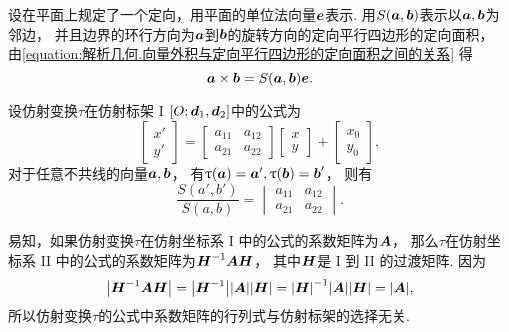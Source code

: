 设在平面上规定了一个定向，用平面的单位法向量\(\boldsymbol{e}\)表示.
用\(S(\boldsymbol{a},\boldsymbol{b})\)表示以\(\boldsymbol{a},\boldsymbol{b}\)为邻边，
并且边界的环行方向为\(\boldsymbol{a}\)到\(\boldsymbol{b}\)的旋转方向的定向平行四边形的定向面积，
由\cref{equation:解析几何.向量外积与定向平行四边形的定向面积之间的关系} 得\begin{equation*}
	\boldsymbol{a}\times\boldsymbol{b}
	= S(\boldsymbol{a},\boldsymbol{b})
	\boldsymbol{e}.
\end{equation*}

\begin{theorem}\label{theorem:平面的仿射变换.仿射变换的变积系数}
设仿射变换\(\tau\)在仿射标架 I \([O;\boldsymbol{d}_1,\boldsymbol{d}_2]\)中的公式为\begin{equation*}
	\begin{bmatrix}
		x' \\ y'
	\end{bmatrix}
	= \begin{bmatrix}
		a_{11} & a_{12} \\
		a_{21} & a_{22}
	\end{bmatrix}
	\begin{bmatrix}
		x \\ y
	\end{bmatrix}
	+ \begin{bmatrix}
		x_0 \\ y_0
	\end{bmatrix},
\end{equation*}
对于任意不共线的向量\(\boldsymbol{a},\boldsymbol{b}\)，
有\(
	\uptau(\boldsymbol{a}) = \boldsymbol{a}',
	\uptau(\boldsymbol{b}) = \boldsymbol{b}'
\)，
则有\begin{equation*}
	\frac{S(a',b')}{S(a,b)}
	= \begin{vmatrix}
		a_{11} & a_{12} \\
		a_{21} & a_{22}
	\end{vmatrix}.
\end{equation*}
\end{theorem}

易知，如果仿射变换\(\tau\)在仿射坐标系 I 中的公式的系数矩阵为\(\boldsymbol{A}\)，
那么\(\tau\)在仿射坐标系 II 中的公式的系数矩阵为\(\boldsymbol{H}^{-1} \boldsymbol{A} \boldsymbol{H}\)，
其中\(\boldsymbol{H}\)是 I 到 II 的过渡矩阵.
因为\begin{equation*}
	\abs{\boldsymbol{H}^{-1} \boldsymbol{A} \boldsymbol{H}}
	= \abs{\boldsymbol{H}^{-1}}
	\abs{\boldsymbol{A}}
	\abs{\boldsymbol{H}}
	= \abs{\boldsymbol{H}}^{-1}
	\abs{\boldsymbol{A}}
	\abs{\boldsymbol{H}}
	= \abs{\boldsymbol{A}},
\end{equation*}
所以仿射变换\(\tau\)的公式中系数矩阵的行列式与仿射标架的选择无关.

